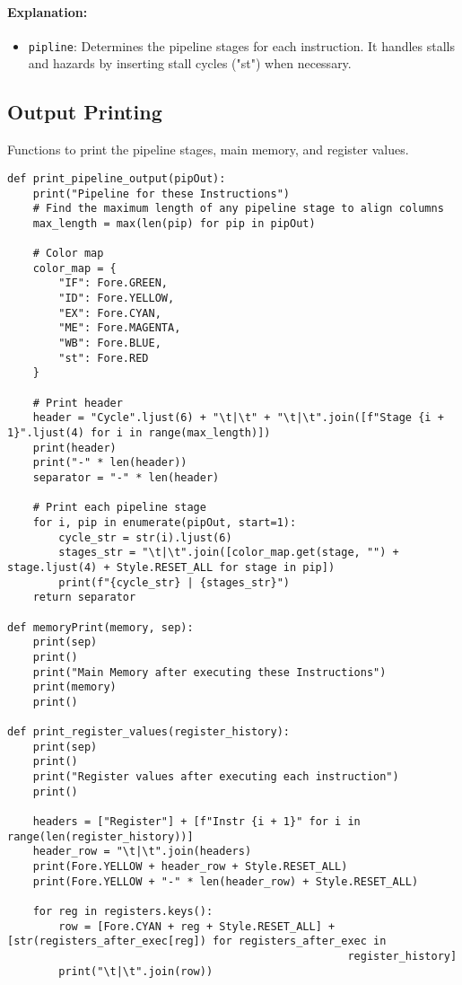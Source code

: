 \documentclass{article}
\begin{document}
\paragraph{Explanation:}
\begin{itemize}
    \item \texttt{pipline}: Determines the pipeline stages for each instruction. It handles stalls and hazards by inserting stall cycles ("st") when necessary.
\end{itemize}

\newpage
\subsection{Output Printing}
Functions to print the pipeline stages, main memory, and register values.

\begin{lstlisting}[caption={Output Printing}]
def print_pipeline_output(pipOut):
    print("Pipeline for these Instructions")
    # Find the maximum length of any pipeline stage to align columns
    max_length = max(len(pip) for pip in pipOut)

    # Color map
    color_map = {
        "IF": Fore.GREEN,
        "ID": Fore.YELLOW,
        "EX": Fore.CYAN,
        "ME": Fore.MAGENTA,
        "WB": Fore.BLUE,
        "st": Fore.RED
    }

    # Print header
    header = "Cycle".ljust(6) + "\t|\t" + "\t|\t".join([f"Stage {i + 1}".ljust(4) for i in range(max_length)])
    print(header)
    print("-" * len(header))
    separator = "-" * len(header)

    # Print each pipeline stage
    for i, pip in enumerate(pipOut, start=1):
        cycle_str = str(i).ljust(6)
        stages_str = "\t|\t".join([color_map.get(stage, "") + stage.ljust(4) + Style.RESET_ALL for stage in pip])
        print(f"{cycle_str} | {stages_str}")
    return separator

def memoryPrint(memory, sep):
    print(sep)
    print()
    print("Main Memory after executing these Instructions")
    print(memory)
    print()

def print_register_values(register_history):
    print(sep)
    print()
    print("Register values after executing each instruction")
    print()

    headers = ["Register"] + [f"Instr {i + 1}" for i in range(len(register_history))]
    header_row = "\t|\t".join(headers)
    print(Fore.YELLOW + header_row + Style.RESET_ALL)
    print(Fore.YELLOW + "-" * len(header_row) + Style.RESET_ALL)

    for reg in registers.keys():
        row = [Fore.CYAN + reg + Style.RESET_ALL] + [str(registers_after_exec[reg]) for registers_after_exec in
                                                     register_history]
        print("\t|\t".join(row))
\end{lstlisting}
\end{document}
